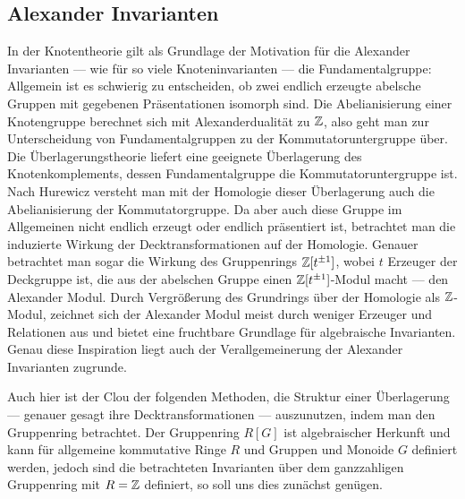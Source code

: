     \subsection{Alexander Invarianten}
     In der Knotentheorie gilt als Grundlage der Motivation für die Alexander Invarianten --- wie für so viele Knoteninvarianten --- die Fundamentalgruppe: Allgemein ist es schwierig zu entscheiden, ob zwei endlich erzeugte abelsche Gruppen mit gegebenen Präsentationen isomorph sind. Die Abelianisierung einer Knotengruppe berechnet sich mit Alexanderdualität zu $\mathbb{Z}$, also geht man zur Unterscheidung von Fundamentalgruppen zu der Kommutatoruntergruppe über. Die Überlagerungstheorie liefert eine geeignete Überlagerung des Knotenkomplements, dessen Fundamentalgruppe die Kommutatoruntergruppe ist. Nach Hurewicz versteht man mit der Homologie dieser Überlagerung auch die Abelianisierung der Kommutatorgruppe. Da aber auch diese Gruppe im Allgemeinen nicht endlich erzeugt oder endlich präsentiert ist, betrachtet man die induzierte Wirkung der Decktransformationen auf der Homologie. Genauer betrachtet man sogar die Wirkung des Gruppenrings $\mathbb{Z} [t^{\pm 1}]$, wobei $t$ Erzeuger der Deckgruppe ist, die aus der abelschen Gruppe einen $\mathbb{Z} [t^{\pm 1}]$-Modul macht --- den Alexander Modul. Durch Vergrößerung des Grundrings über der Homologie als $\mathbb{Z}$-Modul, zeichnet sich der Alexander Modul meist durch weniger Erzeuger und Relationen aus und bietet eine fruchtbare Grundlage für algebraische Invarianten. Genau diese Inspiration liegt auch der Verallgemeinerung der Alexander Invarianten zugrunde.
    
    	Auch hier ist der Clou der folgenden Methoden, die Struktur einer Überlagerung --- genauer gesagt ihre Decktransformationen --- auszunutzen, indem man den Gruppenring betrachtet. Der Gruppenring $R[G]$ ist algebraischer Herkunft und kann für allgemeine kommutative Ringe $R$ und Gruppen und Monoide $G$ definiert werden, jedoch sind die betrachteten Invarianten über dem ganzzahligen Gruppenring mit $R=\mathbb{Z}$ definiert, so soll uns dies zunächst genügen.

